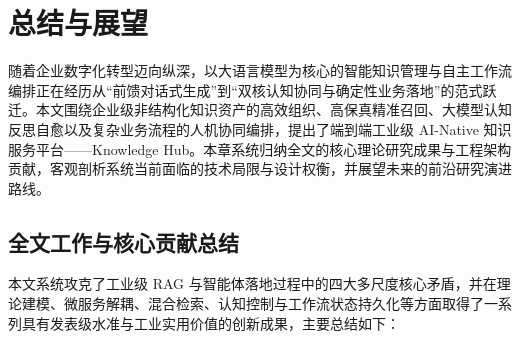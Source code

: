 
\chapter{总结与展望}

随着企业数字化转型迈向纵深，以大语言模型为核心的智能知识管理与自主工作流编排正在经历从“前馈对话式生成”到“双核认知协同与确定性业务落地”的范式跃迁。本文围绕企业级非结构化知识资产的高效组织、高保真精准召回、大模型认知反思自愈以及复杂业务流程的人机协同编排，提出了端到端工业级 AI-Native 知识服务平台——Knowledge Hub。本章系统归纳全文的核心理论研究成果与工程架构贡献，客观剖析系统当前面临的技术局限与设计权衡，并展望未来的前沿研究演进路线。

\section{全文工作与核心贡献总结}

本文系统攻克了工业级 RAG 与智能体落地过程中的四大多尺度核心矛盾，并在理论建模、微服务解耦、混合检索、认知控制与工作流状态持久化等方面取得了一系列具有发表级水准与工业实用价值的创新成果，主要总结如下：


